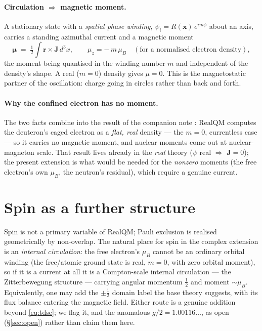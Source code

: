 \documentclass[11pt]{article}
\begin{document}
\paragraph{Circulation $\Rightarrow$ magnetic moment.} A stationary state with a \emph{spatial phase
winding}, $\psi_i = R(\mathbf x)\,e^{im\phi}$ about an axis, carries a standing azimuthal current and a
magnetic moment
\begin{equation}
\boldsymbol\mu \;=\; \tfrac12\!\int \mathbf r\times\mathbf J\,d^3x ,
\qquad \mu_z = -\,m\,\mu_B \quad(\text{for a normalised electron density}),
\label{eq:mu}
\end{equation}
the moment being quantised in the winding number $m$ and independent of the density's shape. A real
($m=0$) density gives $\mu=0$. This is the magnetostatic partner of the oscillation: charge going in
circles rather than back and forth.

\paragraph{Why the confined electron has no moment.} The two facts combine into the result of the
companion note \cite{NuclearMoment}: RealQM computes the deuteron's caged electron as a \emph{flat, real}
density --- the $m=0$, currentless case --- so it carries no magnetic moment, and nuclear moments come out
at nuclear-magneton scale. That result lives already in the \emph{real} theory ($\psi$ real $\Rightarrow$
$\mathbf J=0$); the present extension is what would be needed for the \emph{nonzero} moments (the free
electron's own $\mu_B$, the neutron's residual), which require a genuine current.

\section{Spin as a further structure}
\label{sec:spin}

Spin is not a primary variable of RealQM; Pauli exclusion is realised geometrically by non-overlap. The
natural place for spin in the complex extension is an \emph{internal circulation}: the free electron's
$\mu_B$ cannot be an ordinary orbital winding (the free/atomic ground state is real, $m=0$, with zero
orbital moment), so if it is a current at all it is a Compton-scale internal circulation --- the
Zitterbewegung structure --- carrying angular momentum $\tfrac12$ and moment $\sim\mu_B$. Equivalently, one
may add the $\pm\tfrac12$ domain label the base theory suggests, with its flux balance entering the
magnetic field. Either route is a genuine addition beyond \eqref{eq:tdse}; we flag it, and the anomalous
$g/2=1.00116\ldots$, as open (\S\ref{sec:open}) rather than claim them here.
\end{document}
